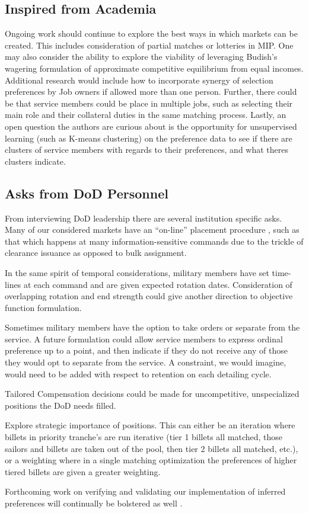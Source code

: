 \subsection{Inspired from Academia}

Ongoing work should continue to explore the best ways in which markets can be created. This includes consideration of partial matches or lotteries in MIP.\cite{1993_Roth} One may also consider the ability to explore the viability of leveraging Budish's wagering formulation of approximate competitive equilibrium from equal incomes.  \cite{2011_Budish} Additional research would include how to incorporate synergy of selection preferences by Job owners if allowed more than one person. \cite{1985_Roth_b}  Further, there could be that service members could be place in multiple jobs, such as selecting their main role and their collateral duties in the same matching process. \cite{1982_Roth} Lastly, an open question the authors are curious about is the opportunity for unsupervised learning (such as K-means clustering) on the preference data to see if there are clusters of service members with regards to their preferences, and what theres clusters indicate.

\subsection{Asks from DoD Personnel}

From interviewing DoD leadership there are several institution specific asks. Many of our considered markets have an “on-line” placement procedure \cite{1994_Khuller}, such as that which happens at many information-sensitive commands due to the trickle of clearance issuance as opposed to bulk assignment. 

In the same spirit of temporal considerations, military members have set time-lines at each command and are given expected rotation dates. Consideration of overlapping rotation and end strength could give another direction to objective function formulation.

Sometimes military members have the option to take orders or separate from the service. A future formulation could allow service members to express ordinal preference up to a point, and then indicate if they do not receive any of those they would opt to separate from the service. A constraint, we would imagine, would need to be added with respect to retention on each detailing cycle.

Tailored Compensation decisions could be made for uncompetitive, unspecialized positions the DoD needs filled.

Explore strategic importance of positions. This can either be an iteration where billets in priority tranche's are run iterative (tier 1 billets all matched, those sailors and billets are taken out of the pool, then tier 2 billets all matched, etc.), or a weighting where in a single matching optimization the preferences of higher tiered billets are given a greater weighting.

Forthcoming work on verifying and validating our implementation of inferred preferences will continually be bolstered as well \cite{2019_Shaw}.